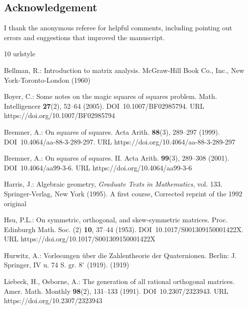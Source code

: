 \documentclass[12pt]{amsart}
\theoremstyle{definition}
\begin{document}
\subsection*{Acknowledgement}I thank the anonymous referee for helpful
comments, including pointing out errors and suggestions that
improved the manuscript.

\begin{thebibliography}{10}
\providecommand{\url}[1]{{#1}}
\providecommand{\urlprefix}{URL }
\expandafter\ifx\csname urlstyle\endcsname\relax
  \providecommand{\doi}[1]{DOI~\discretionary{}{}{}#1}\else
  \providecommand{\doi}{DOI~\discretionary{}{}{}\begingroup
  \urlstyle{rm}\Url}\fi

Bellman, R.: Introduction to matrix analysis.
\newblock McGraw-Hill Book Co., Inc., New York-Toronto-London (1960)

Boyer, C.: Some notes on the magic squares of squares problem.
\newblock Math. Intelligencer \textbf{27}(2), 52--64 (2005).
\newblock \doi{10.1007/BF02985794}.
\newblock \urlprefix\url{https://doi.org/10.1007/BF02985794}

Bremner, A.: On squares of squares.
\newblock Acta Arith. \textbf{88}(3), 289--297 (1999).
\newblock \doi{10.4064/aa-88-3-289-297}.
\newblock \urlprefix\url{https://doi.org/10.4064/aa-88-3-289-297}

Bremner, A.: On squares of squares. {II}.
\newblock Acta Arith. \textbf{99}(3), 289--308 (2001).
\newblock \doi{10.4064/aa99-3-6}.
\newblock \urlprefix\url{https://doi.org/10.4064/aa99-3-6}

Harris, J.: Algebraic geometry, \emph{Graduate Texts in Mathematics}, vol. 133.
\newblock Springer-Verlag, New York (1995).
\newblock A first course, Corrected reprint of the 1992 original

Hsu, P.L.: On symmetric, orthogonal, and skew-symmetric matrices.
\newblock Proc. Edinburgh Math. Soc. (2) \textbf{10}, 37--44 (1953).
\newblock \doi{10.1017/S001309150001422X}.
\newblock \urlprefix\url{https://doi.org/10.1017/S001309150001422X}

Hurwitz, A.: Vorlesungen {\"u}ber die {Zahlentheorie} der {Quaternionen}.
\newblock Berlin: {J}. {Springer}, {IV} u. 74 {S}. gr. {{\(8^\circ\)}} (1919).
  (1919)

Liebeck, H., Osborne, A.: The generation of all rational orthogonal matrices.
\newblock Amer. Math. Monthly \textbf{98}(2), 131--133 (1991).
\newblock \doi{10.2307/2323943}.
\newblock \urlprefix\url{https://doi.org/10.2307/2323943}


\end{thebibliography}
\end{document}
